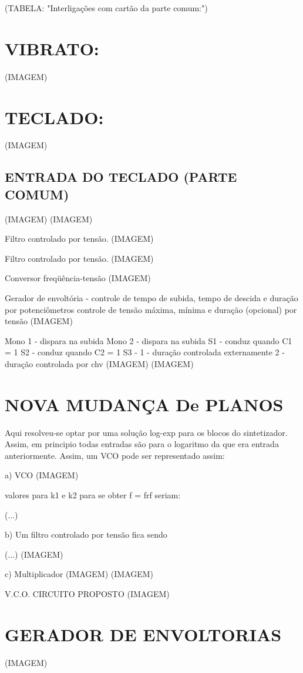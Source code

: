 \documentclass{article}
\begin{document}
(TABELA: "Interligações com cartão da parte comum:")

\section{VIBRATO:}
(IMAGEM)

\section{TECLADO:}
(IMAGEM)

\subsection{ENTRADA DO TECLADO (PARTE COMUM)}
(IMAGEM)
(IMAGEM)

Filtro controlado por tensão.
(IMAGEM)

Filtro controlado por tensão.
(IMAGEM)

Conversor freqüência-tensão
(IMAGEM)

Gerador de envoltória - controle de tempo de subida, tempo de descida e duração por potenciômetros
controle de tensão máxima, mínima e duração (opcional) por tensão
(IMAGEM)

Mono 1 - dispara na subida
Mono 2 - dispara na subida
S1 - conduz quando C1 = 1
S2 - conduz quando C2 = 1
S3 - 1 - duração controlada externamente
     2 - duração controlada por chv
(IMAGEM)
(IMAGEM)

\section{NOVA MUDANÇA De PLANOS}

Aqui resolveu-se optar por uma solução log-exp para os blocos do sintetizador. Assim, em principio todas entradas são para o logaritmo da que era entrada anteriormente. Assim, um VCO pode ser representado assim:

a) VCO
(IMAGEM)

valores para k1 e k2 para se obter f = frf seriam:

(...)

b) Um filtro controlado por tensão fica sendo

(...)
(IMAGEM)

c) Multiplicador
(IMAGEM)
(IMAGEM)

V.C.O. CIRCUITO PROPOSTO
(IMAGEM)

\section{GERADOR DE ENVOLTORIAS}
(IMAGEM)
\end{document}
